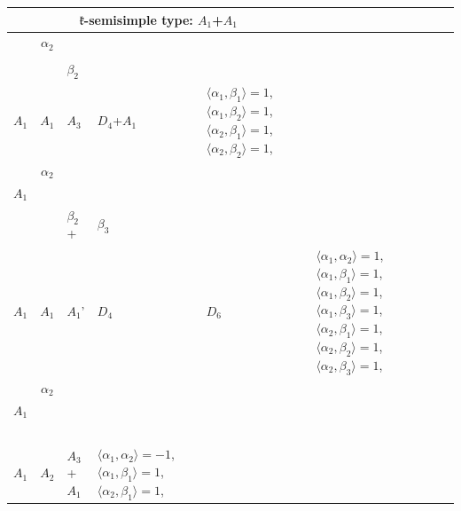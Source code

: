 \documentclass[12pt]{report}
\begin{document}
\begin{appendix}
{\begin{longtable}{rcl p{1cm}p{1cm}p{3cm} }
\\
\hline\multicolumn{5}{c}{$\mathfrak{k}$-semisimple type: $A_1$+$A_1$}\\
\hline\hline\begin{tabular}{cc}$\alpha_1$+ & $\alpha_2$\\\tiny{  } & \tiny{  }\end{tabular} &\begin{tabular}{c} = \\~ \end{tabular} & \begin{tabular}{cc}$\beta_1$+ & $\beta_2$\\\tiny{ $A_1$ } & \tiny{ $A_1$ }\end{tabular} & $A_3$ & $D_4$+$A_1$ &  $\langle\alpha_1, \beta_1\rangle=1$, $\langle\alpha_1, \beta_2\rangle=1$, $\langle\alpha_2, \beta_1\rangle=1$, $\langle\alpha_2, \beta_2\rangle=1$, 
\\
\begin{tabular}{cc}$\alpha_1$+ & $\alpha_2$\\\tiny{ $A_1$ } & \tiny{  }\end{tabular} &\begin{tabular}{c} = \\~ \end{tabular} & \begin{tabular}{ccc}$\beta_1$+ & $\beta_2$+ & $\beta_3$\\\tiny{ $A_1$ } & \tiny{ $A_1$ } & \tiny{ $A_1$' }\end{tabular} & $D_4$ & $D_6$ & $\langle\alpha_1, \alpha_2\rangle=1$,  $\langle\alpha_1, \beta_1\rangle=1$, $\langle\alpha_1, \beta_2\rangle=1$, $\langle\alpha_1, \beta_3\rangle=1$, $\langle\alpha_2, \beta_1\rangle=1$, $\langle\alpha_2, \beta_2\rangle=1$, $\langle\alpha_2, \beta_3\rangle=1$, 
\\
\begin{tabular}{cc}$\alpha_1$+ & $\alpha_2$\\\tiny{ $A_1$ } & \tiny{  }\end{tabular} &\begin{tabular}{c} = \\~ \end{tabular} & \begin{tabular}{c}$\beta_1$\\\tiny{ $A_1$ }\end{tabular} & $A_2$ & $A_3$+$A_1$ & $\langle\alpha_1, \alpha_2\rangle=-1$,  $\langle\alpha_1, \beta_1\rangle=1$, $\langle\alpha_2, \beta_1\rangle=1$, 
\\

\end{longtable}}
\end{appendix}
\end{document}
